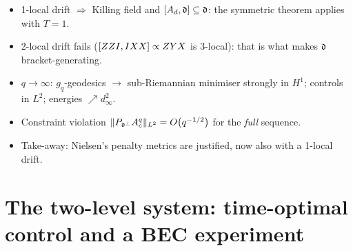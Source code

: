 \documentclass[handoutsbeamer.tex]{subfiles}
\begin{document}
\begin{frame}
{\begin{itemize}
    \item 1-local drift $\Rightarrow$ Killing field and $\left[A_d,\mathfrak{d}\right]\subseteq\mathfrak{d}$: the symmetric theorem applies with $T=1$.
    \item 2-local drift fails ($\left[ZZI,IXX\right]\propto ZYX$ is 3-local): that is what makes $\mathfrak{d}$ bracket-generating.
    \item $q\to\infty$: $g_q$-geodesics $\to$ sub-Riemannian minimiser strongly in $H^1$; controls in $L^2$; energies $\nearrow d_\infty^2$.
    \item Constraint violation $\|P_{\mathfrak{d}^\perp}A_c^q\|_{L^2}=O\!\left(q^{-1/2}\right)$ for the \emph{full} sequence.
    \item Take-away: \alert{Nielsen's penalty metrics are justified}, now also with a 1-local drift.
\end{itemize}}
\end{frame}

\section{The two-level system: time-optimal control and a BEC experiment}
\end{document}
